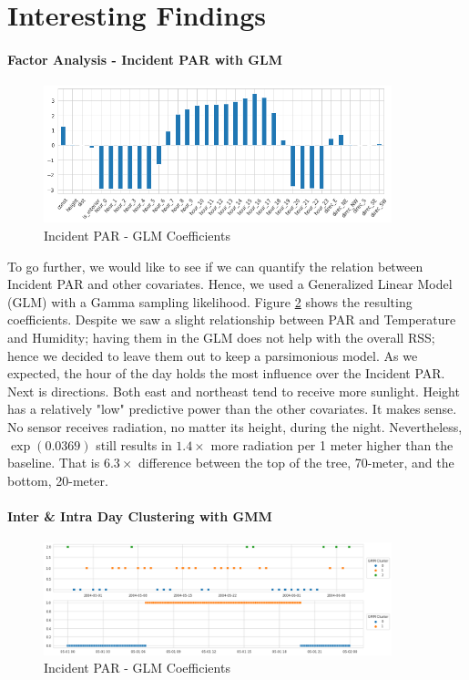 \documentclass[11pt, letterpaper]{article}
\begin{document}
\section{Interesting Findings}
\paragraph{Factor Analysis - Incident PAR with GLM}
\begin{figure}[h!]
\centering
\includegraphics[width=0.9\textwidth]{eda_3.5.png}
\captionsetup{justification=centering}
\caption{Incident PAR - GLM Coefficients}
\label{fig:glm_coef}
\end{figure}
To go further, we would like to see if we can quantify the relation between Incident PAR and other covariates. Hence, we used a Generalized Linear Model (GLM) with a Gamma sampling likelihood. Figure \ref{fig:glm_coef} shows the resulting coefficients. Despite we saw a slight relationship between PAR and Temperature and Humidity; having them in the GLM does not help with the overall RSS; hence we decided to leave them out to keep a parsimonious model. As we expected, the hour of the day holds the most influence over the Incident PAR. Next is directions. Both east and northeast tend to receive more sunlight. Height has a relatively "low" predictive power than the other covariates. It makes sense. No sensor receives radiation, no matter its height, during the night. Nevertheless, $\exp(0.0369)$ still results in $1.4\times$ more radiation per 1 meter higher than the baseline. That is $6.3\times$ difference between the top of the tree, 70-meter, and the bottom, 20-meter.

\paragraph{Inter & Intra Day Clustering with GMM}
\begin{figure}[h!]
\centering
\includegraphics[width=0.9\textwidth]{if_4.3.png}
\captionsetup{justification=centering}
\caption{Incident PAR - GLM Coefficients}
\label{fig:glm_coef}
\end{figure}
\end{document}
